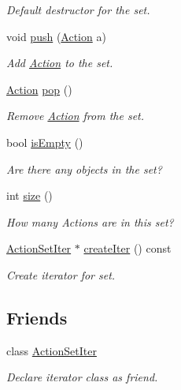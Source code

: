 \begin{DoxyCompactItemize}
\begin{DoxyCompactList}\small\item\em Default destructor for the set. \end{DoxyCompactList}\item 
void \hyperlink{classActionSet_a2283fd90299aa1b8390c5957164032b8}{push} (\hyperlink{classAction}{Action} a)
\begin{DoxyCompactList}\small\item\em Add \hyperlink{classAction}{Action} to the set. \end{DoxyCompactList}\item 
\hyperlink{classAction}{Action} \hyperlink{classActionSet_a079095c7b16385741f48c1f75bc225ba}{pop} ()
\begin{DoxyCompactList}\small\item\em Remove \hyperlink{classAction}{Action} from the set. \end{DoxyCompactList}\item 
bool \hyperlink{classActionSet_a76b75c1f8ce17b41f3868c3ef845daf6}{is\-Empty} ()
\begin{DoxyCompactList}\small\item\em Are there any objects in the set? \end{DoxyCompactList}\item 
int \hyperlink{classActionSet_aa41e9f5b446070bf5b57d9d314b3960c}{size} ()
\begin{DoxyCompactList}\small\item\em How many Actions are in this set? \end{DoxyCompactList}\item 
\hypertarget{classActionSet_aee6a3a79570dd883dafdd66285f2eb39}{\hyperlink{classActionSetIter}{Action\-Set\-Iter} $\ast$ \hyperlink{classActionSet_aee6a3a79570dd883dafdd66285f2eb39}{create\-Iter} () const }\label{classActionSet_aee6a3a79570dd883dafdd66285f2eb39}

\begin{DoxyCompactList}\small\item\em Create iterator for set. \end{DoxyCompactList}\end{DoxyCompactItemize}
\subsection*{Friends}
\begin{DoxyCompactItemize}
\item 
\hypertarget{classActionSet_aadd7d34449f2080eeb1259cf3ce0c141}{class \hyperlink{classActionSet_aadd7d34449f2080eeb1259cf3ce0c141}{Action\-Set\-Iter}}\label{classActionSet_aadd7d34449f2080eeb1259cf3ce0c141}

\begin{DoxyCompactList}\small\item\em Declare iterator class as friend. \end{DoxyCompactList}\end{DoxyCompactItemize}


